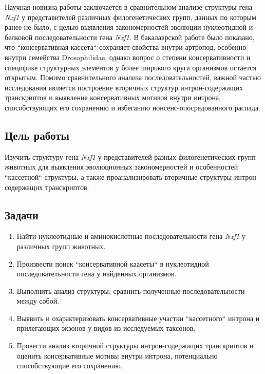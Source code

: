 Научная новизна работы заключается в сравнительном анализе структуры гена \textit{Nxf1} у представителей различных филогенетических групп, данных по которым ранее не было, с целью выявления закономерностей эволюции нуклеотидной и белковой последовательности гена \textit{Nxf1}.
В бакалаврской работе было показано, что ``консервативная кассета`` сохраняет свойства внутри артропод, особенно внутри семейства Drosophilidae, однако вопрос о степени консервативности и специфике структурных элементов у более широкого круга организмов остается открытым.
Помимо сравнительного анализа последовательностей, важной частью исследования является построение вторичных структур интрон-содержащих транскриптов и выявление консервативных мотивов внутри интрона, способствующих его сохранению и избеганию нонсенс-опосредованного распада.


\subsection{Цель работы}

Изучить структуру гена \textit{Nxf1} у представителей разных филогенетических групп животных для выявления эволюционных закономерностей и особенностей ``кассетной`` структуры, а также проанализировать вторичные структуры интрон-содержащих транскриптов.


\subsection{Задачи}

\begin{enumerate}[left=\parindent]
  \item Найти нуклеотидные и аминокислотные последовательности гена \textit{Nxf1} у различных групп животных.
  \item Произвести поиск ``консервативной каасеты`` в нуклеотидной последовательности гена у найденных организмов.
  \item Выполнить анализ структуры, сравнить полученные последовательности между собой.
  \item Выявить и охарактеризовать консервативные участки ``кассетного`` интрона и прилегающих экзонов у видов из исследуемых таксонов.
  \item Провести анализ вторичной структуры интрон-содержащих транскриптов и оценить консервативные мотивы внутри интрона, потенциально способствующие его сохранению.
\end{enumerate}

